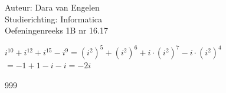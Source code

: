 \documentclass[a4paper]{article}
\begin{document}
  
\noindent \large Auteur: Dara van Engelen \\
\noindent \large Studierichting: Informatica\\
\noindent \large Oefeningenreeks 1B nr 16.17
\\

\medskip

\normalsize

$ i^{10}+i^{12}+i^{15}-i^9  = (i^2)^5 + (i^2)^6 + i \cdot (i^2)^7 - i \cdot (i^2)^4 $\\

$ = -1+1-i-i = -2i $\\

\begin{thebibliography}{999}
\end{thebibliography}
\end{document}
